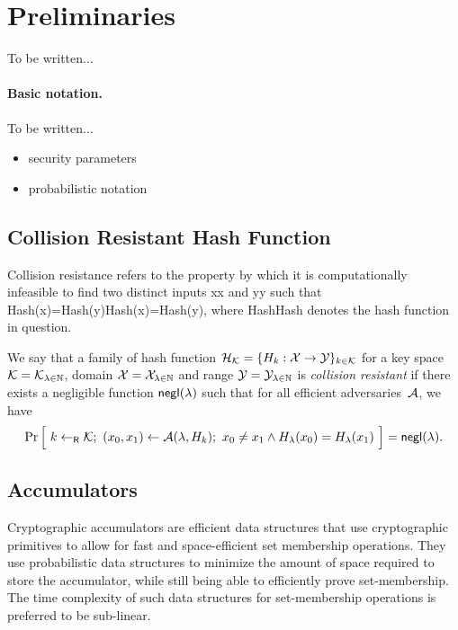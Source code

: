 \section{Preliminaries}

To be written...

\paragraph{Basic notation.}
\label{sec:notation}

To be written...
\begin{itemize}[noitemsep]
    \item security parameters
    \item probabilistic notation
\end{itemize}

\subsection{Collision Resistant Hash Function}
Collision resistance refers to the property by which it is computationally 
infeasible to find two distinct inputs xx and yy such that Hash(x)=Hash(y)Hash(x)=Hash(y), where HashHash denotes the hash function in question.

\newcommand{\getsr}{\gets_{\ms{R}}}

\begin{definition}
    We say that a family of hash function $\mathcal{H}_{\mathcal{K}} = \{ H_k: \mathcal{X} \to
    \mathcal{Y} \}_{k \in \mathcal{K}}$ for a key space $\mathcal{K} = \mathcal{K}_{\lambda \in \mathbb{N}}$,
    domain $\mathcal{X} = \mathcal{X}_{\lambda \in \mathbb{N}}$ and range $\mathcal{Y} = \mathcal{Y}_{\lambda
    \in \mathbb{N}}$ is \emph{collision resistant} if there exists a negligible
    function $\mathsf{negl}(\lambda)$ such that for all efficient adversaries~$\mathcal{A}$,
    we have
    \[ \Pr\Big[~ k \getsr \calK;~ (x_0, x_1) \gets \calA(\lambda, H_k);~
    x_0 \neq x_1 \land H_\lambda(x_0) = H_\lambda(x_1) ~\Big] = \negl(\lambda)
.\]
\end{definition}

\subsection{Accumulators}

Cryptographic accumulators are efficient data structures that use cryptographic 
primitives to allow for fast and space-efficient set membership operations. They
use probabilistic data structures to minimize the amount of space required to 
store the accumulator, while still being able to efficiently prove set-membership.
The time complexity of such data structures for set-membership operations is 
preferred to be sub-linear.

